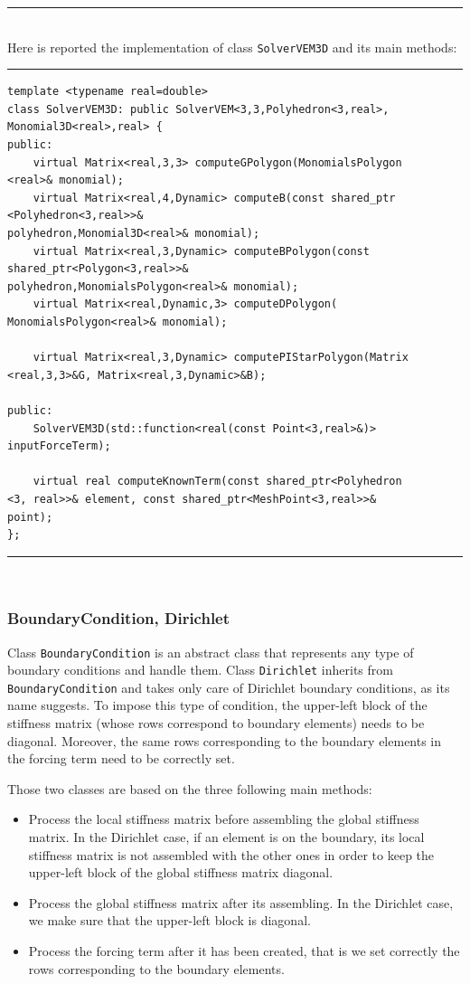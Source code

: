 \noindent\rule{12.7cm}{1pt}\\

Here is reported the implementation of class \verb|SolverVEM3D| and its main methods:

\noindent\rule{12.7cm}{1pt}
\begin{verbatim}
template <typename real=double>
class SolverVEM3D: public SolverVEM<3,3,Polyhedron<3,real>,
Monomial3D<real>,real> {
public:
    virtual Matrix<real,3,3> computeGPolygon(MonomialsPolygon
<real>& monomial);
    virtual Matrix<real,4,Dynamic> computeB(const shared_ptr
<Polyhedron<3,real>>& 
polyhedron,Monomial3D<real>& monomial);
    virtual Matrix<real,3,Dynamic> computeBPolygon(const 
shared_ptr<Polygon<3,real>>& 
polyhedron,MonomialsPolygon<real>& monomial);
    virtual Matrix<real,Dynamic,3> computeDPolygon(
MonomialsPolygon<real>& monomial);
		
    virtual Matrix<real,3,Dynamic> computePIStarPolygon(Matrix
<real,3,3>&G, Matrix<real,3,Dynamic>&B);
	
public:
    SolverVEM3D(std::function<real(const Point<3,real>&)> 
inputForceTerm);
 
    virtual real computeKnownTerm(const shared_ptr<Polyhedron
<3, real>>& element, const shared_ptr<MeshPoint<3,real>>& 
point);	
};

\end{verbatim}
\noindent\rule{12.7cm}{1pt}\\

\subsubsection{BoundaryCondition, Dirichlet}
Class \verb|BoundaryCondition| is an abstract class that represents any type of boundary conditions and handle them. Class \verb|Dirichlet| inherits from \verb|BoundaryCondition| and takes only care of Dirichlet boundary conditions, as its name suggests. To impose this type of condition, the upper-left block of the stiffness matrix (whose rows correspond to boundary elements) needs to be diagonal. Moreover, the same rows corresponding to the boundary elements in the forcing term need to be correctly set. 

Those two classes are based on the three following main methods: 
\begin{itemize}
\item Process the local stiffness matrix before assembling the global stiffness matrix. In the Dirichlet case, if an element is on the boundary, its local stiffness matrix is not assembled with the other ones in order to keep the upper-left block of the global stiffness matrix diagonal. 
\item Process the global stiffness matrix after its assembling. In the Dirichlet case, we make sure that the upper-left block is diagonal. 
\item Process the forcing term after it has been created, that is we set correctly the rows corresponding to the boundary elements. 
\end{itemize}

